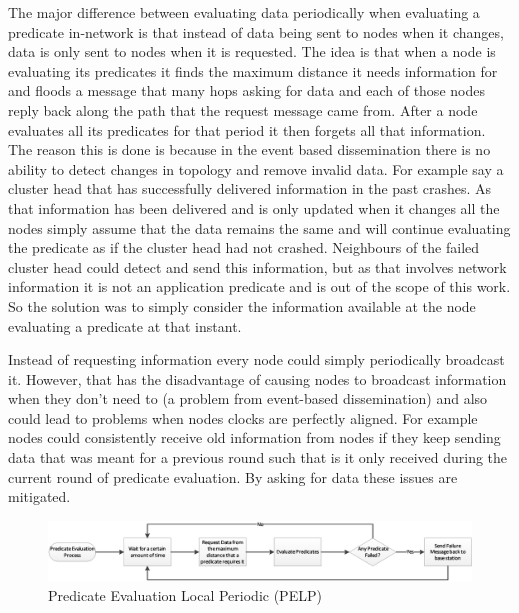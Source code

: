 The major difference between evaluating data periodically when evaluating a predicate in-network is that instead of data being sent to nodes when it changes, data is only sent to nodes when it is requested. The idea is that when a node is evaluating its predicates it finds the maximum distance it needs information for and floods a message that many hops asking for data and each of those nodes reply back along the path that the request message came from. After a node evaluates all its predicates for that period it then forgets all that information. The reason this is done is because in the event based dissemination there is no ability to detect changes in topology and remove invalid data. For example say a cluster head that has successfully delivered information in the past crashes. As that information has been delivered and is only updated when it changes all the nodes simply assume that the data remains the same and will continue evaluating the predicate as if the cluster head had not crashed. Neighbours of the failed cluster head could detect and send this information, but as that involves network information it is not an application predicate and is out of the scope of this work. So the solution was to simply consider the information available at the node evaluating a predicate at that instant.

Instead of requesting information every node could simply periodically broadcast it. However, that has the disadvantage of causing nodes to broadcast information when they don't need to (a problem from event-based dissemination) and also could lead to problems when nodes clocks are perfectly aligned. For example nodes could consistently receive old information from nodes if they keep sending data that was meant for a previous round such that is it only received during the current round of predicate evaluation. By asking for data these issues are mitigated.

\begin{figure}[H]
\centering
\includegraphics[width=\linewidth]{Diagrams/pelp.eps}
\caption{Predicate Evaluation Local Periodic (PELP)}
\end{figure}

